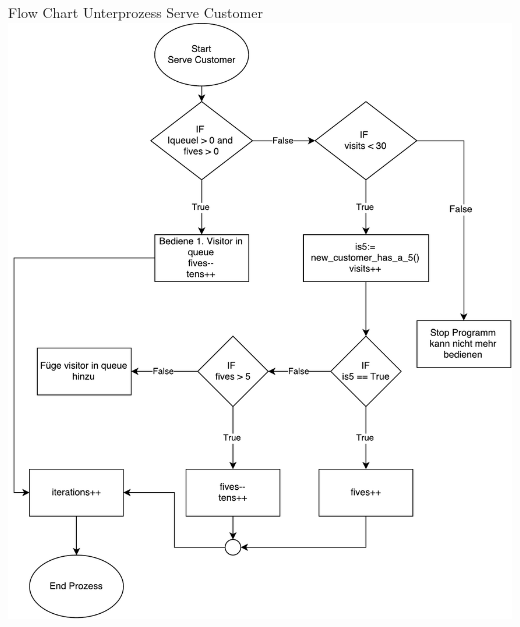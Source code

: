 \begin{frame}{Flow Chart Unterprozess Serve Customer}
	\centering
  	\includegraphics[scale=0.25]{BSP18_Flow_Chart_2.pdf}
\end{frame}

